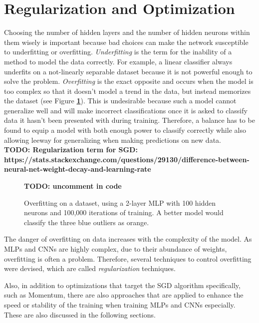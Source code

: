 	\section {Regularization and Optimization}
\label{sec:reg_opt}

Choosing the number of hidden layers and the number of hidden neurons within them wisely is important because bad choices can make the network susceptible to underfitting or overfitting. \textit{Underfitting} is the term for the inability of a method to model the data correctly. For example, a linear classifier always underfits on a not-linearly separable dataset because it is not powerful enough to solve the problem. \textit{Overfitting} is the exact opposite and occurs when the model is too complex so that it doesn't model a trend in the data, but instead memorizes the dataset (see Figure \textbf{\ref{fig:overfit}}). This is undesirable because such a model cannot generalize well and will make incorrect classifications once it is asked to classify data it hasn't been presented with during training. Therefore, a balance has to be found to equip a model with both enough power to classify correctly while also allowing leeway for generalizing when making predictions on new data.\\

\textbf{TODO: Regularization term for SGD: https://stats.stackexchange.com/questions/29130/difference-between-neural-net-weight-decay-and-learning-rate}\\

	\begin {figure}[!ht]
		\begin{center}
			\textbf{TODO: uncomment in code}
		\end{center}
		\caption[]{Overfitting on a dataset, using a 2-layer MLP with 100 hidden neurons and 100,000 iterations of training. A better model would classify the three blue outliers as orange.}
		\label{fig:overfit}
	\end {figure}

\noindent The danger of overfitting on data increases with the complexity of the model. As MLPs and CNNs are highly complex, due to their abundance of weights, overfitting is often a problem. Therefore, several techniques to control overfitting were devised, which are called \textit{regularization} techniques.

Also, in addition to optimizations that target the SGD algorithm specifically, such as Momentum, there are also approaches that are applied to enhance the speed or stability of the training when training MLPs and CNNs especially. These are also discussed in the following sections.

